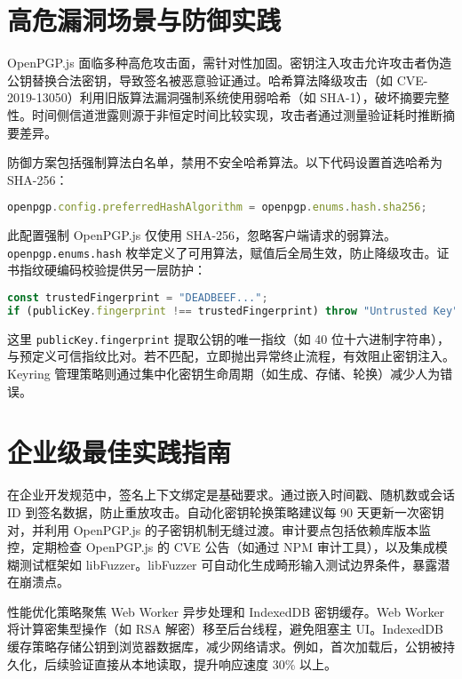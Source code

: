 \chapter{高危漏洞场景与防御实践}
OpenPGP.js 面临多种高危攻击面，需针对性加固。密钥注入攻击允许攻击者伪造公钥替换合法密钥，导致签名被恶意验证通过。哈希算法降级攻击（如 CVE-2019-13050）利用旧版算法漏洞强制系统使用弱哈希（如 SHA-1），破坏摘要完整性。时间侧信道泄露则源于非恒定时间比较实现，攻击者通过测量验证耗时推断摘要差异。\par
防御方案包括强制算法白名单，禁用不安全哈希算法。以下代码设置首选哈希为 SHA-256：\par
\begin{lstlisting}[language=javascript]
openpgp.config.preferredHashAlgorithm = openpgp.enums.hash.sha256;
\end{lstlisting}
此配置强制 OpenPGP.js 仅使用 SHA-256，忽略客户端请求的弱算法。\texttt{openpgp.enums.hash} 枚举定义了可用算法，赋值后全局生效，防止降级攻击。证书指纹硬编码校验提供另一层防护：\par
\begin{lstlisting}[language=javascript]
const trustedFingerprint = "DEADBEEF...";
if (publicKey.fingerprint !== trustedFingerprint) throw "Untrusted Key";
\end{lstlisting}
这里 \texttt{publicKey.fingerprint} 提取公钥的唯一指纹（如 40 位十六进制字符串），与预定义可信指纹比对。若不匹配，立即抛出异常终止流程，有效阻止密钥注入。Keyring 管理策略则通过集中化密钥生命周期（如生成、存储、轮换）减少人为错误。\par
\chapter{企业级最佳实践指南}
在企业开发规范中，签名上下文绑定是基础要求。通过嵌入时间戳、随机数或会话 ID 到签名数据，防止重放攻击。自动化密钥轮换策略建议每 90 天更新一次密钥对，并利用 OpenPGP.js 的子密钥机制无缝过渡。审计要点包括依赖库版本监控，定期检查 OpenPGP.js 的 CVE 公告（如通过 NPM 审计工具），以及集成模糊测试框架如 libFuzzer。libFuzzer 可自动化生成畸形输入测试边界条件，暴露潜在崩溃点。\par
性能优化策略聚焦 Web Worker 异步处理和 IndexedDB 密钥缓存。Web Worker 将计算密集型操作（如 RSA 解密）移至后台线程，避免阻塞主 UI。IndexedDB 缓存策略存储公钥到浏览器数据库，减少网络请求。例如，首次加载后，公钥被持久化，后续验证直接从本地读取，提升响应速度 30\%{} 以上。\par
